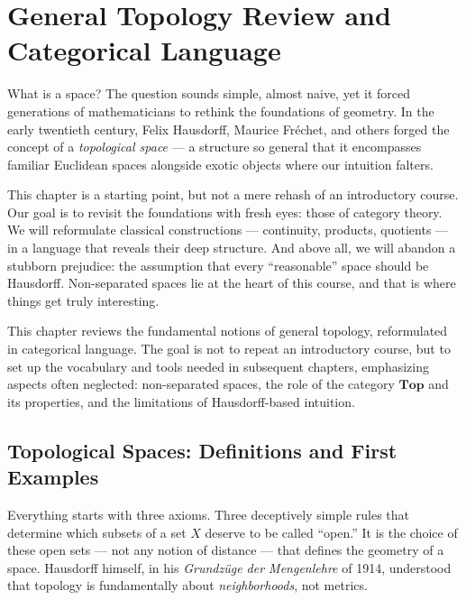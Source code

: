 \chapter{General Topology Review and Categorical Language}
\label{ch:review}

What is a space? The question sounds simple, almost naive, yet it forced
generations of mathematicians to rethink the foundations of geometry. In the
early twentieth century, Felix Hausdorff, Maurice Fr\'echet, and others forged
the concept of a \emph{topological space} --- a structure so general that it
encompasses familiar Euclidean spaces alongside exotic objects where our
intuition falters.

This chapter is a starting point, but not a mere rehash of an introductory
course. Our goal is to revisit the foundations with fresh eyes: those of
category theory. We will reformulate classical constructions --- continuity,
products, quotients --- in a language that reveals their deep structure. And
above all, we will abandon a stubborn prejudice: the assumption that every
``reasonable'' space should be Hausdorff. Non-separated spaces lie at the
heart of this course, and that is where things get truly interesting.

\begin{intuition}
This chapter reviews the fundamental notions of general topology, reformulated in
categorical language. The goal is not to repeat an introductory course, but to set up the
vocabulary and tools needed in subsequent chapters, emphasizing aspects often neglected:
non-separated spaces, the role of the category $\mathbf{Top}$ and its properties, and the
limitations of Hausdorff-based intuition.
\end{intuition}

\section{Topological Spaces: Definitions and First Examples}

Everything starts with three axioms. Three deceptively simple rules that
determine which subsets of a set $X$ deserve to be called ``open.'' It is the
choice of these open sets --- not any notion of distance --- that defines the
geometry of a space. Hausdorff himself, in his \emph{Grundz\"uge der
Mengenlehre} of 1914, understood that topology is fundamentally about
\emph{neighborhoods}, not metrics.

